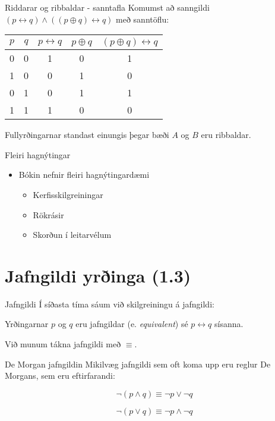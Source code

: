 \documentclass[handout]{beamer}
\begin{document}
\begin{frame}{Riddarar og ribbaldar - sanntafla}
Komumst að sanngildi $(p \leftrightarrow q) \land ((p \oplus q) \leftrightarrow q)$ með sanntöflu: \pause
\begin{center}
\begin{tabular}{ccccc}
\toprule
$p$&$q$&$p \leftrightarrow q$&$p \oplus q$& $(p \oplus q) \leftrightarrow q$\\
\midrule
0&0&1&0&1\\
1&0&0&1&0\\
0&1&0&1&1\\
1&1&1&0&0\\
\bottomrule
\end{tabular}
\end{center}\pause
Fullyrðingarnar standast einungis þegar bæði $A$ og $B$ eru ribbaldar.
\end{frame}

\begin{frame}{Fleiri hagnýtingar}
\begin{itemize}
  \item Bókin nefnir fleiri hagnýtingardæmi
  \begin{itemize}
    \item Kerfisskilgreiningar
    \item Rökrásir
    \item Skorðun í leitarvélum
  \end{itemize}  
\end{itemize}
\end{frame}

\section{Jafngildi yrðinga (1.3)}

\begin{frame}{Jafngildi}
Í síðasta tíma sáum við skilgreiningu á jafngildi:

\begin{tcolorbox}[title=Jafngildi]
Yrðingarnar $p$ og $q$ eru jafngildar (e. \emph{equivalent}) sé $p \leftrightarrow q$ sísanna.
\end{tcolorbox}

Við munum tákna jafngildi með $\equiv$.
\end{frame}

\begin{frame}{De Morgan jafngildin}
Mikilvæg jafngildi sem oft koma upp eru reglur De Morgans, sem eru eftirfarandi:

\[
 \lnot ( p \land q ) \equiv \lnot p \lor \lnot q
\]

\[
 \lnot (p \lor q ) \equiv \lnot p \land \lnot q
\]

\end{frame}
\end{document}
